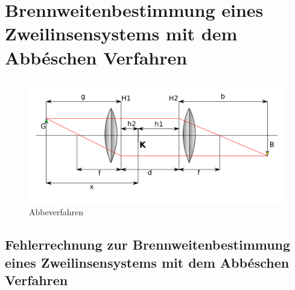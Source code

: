 \section{Brennweitenbestimmung eines Zweilinsensystems mit dem Abbéschen Verfahren}

\begin{figure}
    \centering
    \includegraphics[scale=0.8]{Geometrische_Optik/Protokoll/fig/Abbeverfahren.png}
    \caption{Abbeverfahren}
    \label{fig:Abbeverfahren}
\end{figure}

\subsection{Fehlerrechnung zur Brennweitenbestimmung eines Zweilinsensystems mit dem Abbéschen Verfahren}